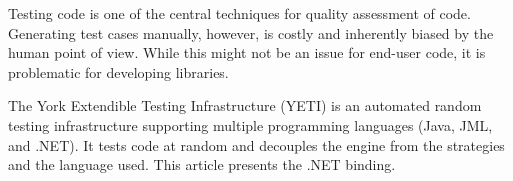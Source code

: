 Testing code is one of the central techniques for quality assessment of code. Generating 
test cases manually, however, is costly and inherently biased by the human point of view. While 
this might not be an issue for end-user code, it is problematic for developing libraries. 

The York Extendible Testing Infrastructure (YETI) is an automated random testing infrastructure
supporting multiple programming languages (Java, JML, and .NET). It tests code at random and 
decouples the engine from the strategies and the language used. This article presents
the .NET binding. 
